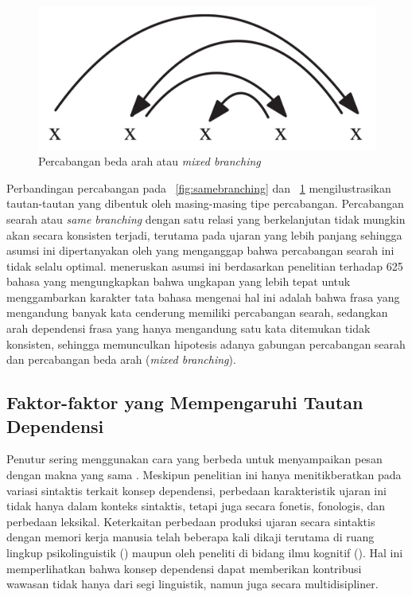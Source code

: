 \begin{figure}
	\centering \includegraphics[width=0.5
	\textwidth] {pics/mixedbranching.png} \caption{Percabangan beda arah atau \textit{mixed branching}} 
\label{fig:mixedbranching} \end{figure}

Perbandingan percabangan pada \pic~\ref{fig:samebranching} dan \pic~\ref{fig:mixedbranching} mengilustrasikan tautan-tautan yang dibentuk oleh masing-masing tipe percabangan. Percabangan searah atau \textit{same branching} dengan satu relasi yang berkelanjutan tidak mungkin akan secara konsisten terjadi, terutama pada ujaran yang lebih panjang sehingga asumsi ini dipertanyakan oleh \cite{temperley2008dependency} yang menganggap bahwa percabangan searah ini tidak selalu optimal. \cite{temperley2008dependency} meneruskan asumsi ini berdasarkan penelitian \cite{dryer1992greenbergian} terhadap 625 bahasa yang mengungkapkan bahwa ungkapan yang lebih tepat untuk menggambarkan karakter tata bahasa mengenai hal ini adalah bahwa frasa yang mengandung banyak kata cenderung memiliki percabangan searah, sedangkan arah dependensi frasa yang hanya mengandung satu kata ditemukan tidak konsisten, sehingga memunculkan hipotesis adanya gabungan percabangan searah dan percabangan beda arah (\textit{mixed branching}). 

\subsection{Faktor-faktor yang Mempengaruhi Tautan Dependensi}
Penutur sering menggunakan cara yang berbeda untuk menyampaikan pesan dengan makna yang sama \citep{kroch2001syntactic}. Meskipun penelitian ini hanya menitikberatkan pada variasi sintaktis terkait konsep dependensi, perbedaan karakteristik ujaran ini tidak hanya dalam konteks sintaktis, tetapi juga secara fonetis, fonologis, dan perbedaan leksikal. Keterkaitan perbedaan produksi ujaran secara sintaktis dengan memori kerja manusia telah beberapa kali dikaji terutama di ruang lingkup psikolinguistik (\citealp{jay2003psychology, levy2013surprisal}) maupun oleh peneliti di bidang ilmu kognitif (\citealp{futrell2015large, christiansen2016now, liu2017dependency}). Hal ini memperlihatkan bahwa konsep dependensi dapat memberikan kontribusi wawasan tidak hanya dari segi linguistik, namun juga secara multidisipliner.

